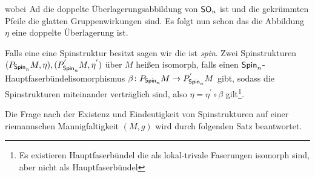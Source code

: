\begin{Def}[Spinstruktur]
\begin{itemize}
                         wobei $\operatorname{Ad}$ die doppelte
                         Überlagerungsabbildung von $\operatorname{\mathsf{SO}}_n$ ist und
                        die gekrümmten Pfeile die glatten Gruppenwirkungen sind.
                         Es folgt nun schon das die Abbildung $\eta$   eine doppelte Überlagerung ist.
	 \end{itemize}
	 Falls eine \RMF eine Spinstruktur besitzt sagen wir die \mfg
         ist \textit{spin}.
     Zwei Spinstrukturen $ (P_{\operatorname{\mathsf{Spin}}_n}M,\eta),(P_{\operatorname{\mathsf{Spin}}_n}^{'}M,\eta^{'}) $ über $ M $ heißen isomorph, falls einen $ \operatorname{\mathsf{Spin}}_n $-Hauptfaserbündelisomorphismus $ \beta \colon P_{\operatorname{\mathsf{Spin}}_n}M \rightarrow P_{\operatorname{\mathsf{Spin}}_n}^{'}M $ gibt, sodass die
     Spinstrukturen miteinander verträglich sind, also $ \eta=\eta^{'} \circ \beta $ gilt\footnote{Es existieren Hauptfaserbündel die als lokal-trivale Faserungen isomorph sind, aber nicht als Hauptfaserbündel}.
\end{Def}

Die Frage nach der Existenz und Eindeutigkeit von Spinstrukturen 
auf einer riemannschen Mannigfaltigkeit $ (M,g) $ wird durch folgenden
Satz beantwortet.

